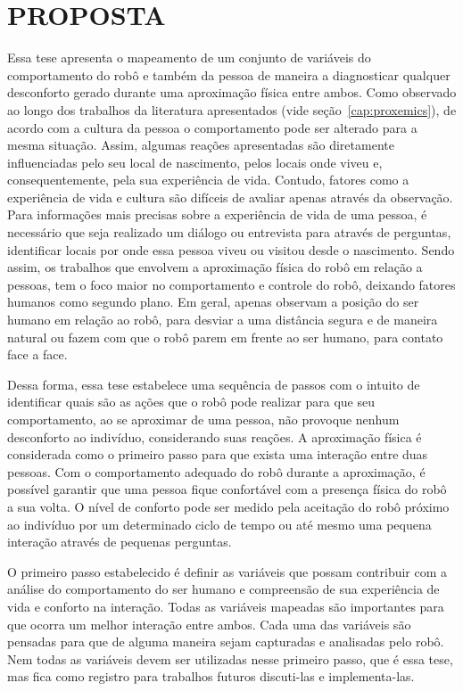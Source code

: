 \chapter{PROPOSTA}
\label{cap:proposta}

Essa tese apresenta o mapeamento de um conjunto de variáveis do comportamento do robô e também da pessoa de maneira a diagnosticar qualquer desconforto gerado durante uma aproximação física entre ambos. Como observado ao longo dos trabalhos da literatura apresentados (vide seção~\ref{cap:proxemics}), de acordo com a cultura da pessoa o comportamento pode ser alterado para a mesma situação. Assim, algumas reações apresentadas são diretamente influenciadas pelo seu local de nascimento, pelos locais onde viveu e, consequentemente, pela sua experiência de vida. Contudo, fatores como a experiência de vida e cultura são difíceis de avaliar apenas através da observação. Para informações mais precisas sobre a experiência de vida de uma pessoa, é necessário que seja realizado um diálogo ou entrevista para através de perguntas, identificar locais por onde essa pessoa viveu ou visitou desde o nascimento. Sendo assim, os trabalhos que envolvem a aproximação física do robô em relação a pessoas, tem o foco maior no comportamento e controle do robô, deixando fatores humanos como segundo plano. Em geral, apenas observam a posição do ser humano em relação ao robô, para desviar a uma distância segura e de maneira natural ou fazem com que o robô parem em frente ao ser humano, para contato face a face.

Dessa forma, essa tese estabelece uma sequência de passos com o intuito de identificar quais são as ações que o robô pode realizar para que seu comportamento, ao se aproximar de uma pessoa, não provoque nenhum desconforto ao indivíduo, considerando suas reações. A aproximação física é considerada como o primeiro passo para que exista uma interação entre duas pessoas. Com o comportamento adequado do robô durante a aproximação, é possível garantir que uma pessoa fique confortável com a presença física do robô a sua volta. O nível de conforto pode ser medido pela aceitação do robô próximo ao indivíduo por um determinado ciclo de tempo ou até mesmo uma pequena interação através de pequenas perguntas.

O primeiro passo estabelecido é definir as variáveis que possam contribuir com a análise do comportamento do ser humano e compreensão de sua experiência de vida e conforto na interação. Todas as variáveis mapeadas são importantes para que ocorra um melhor interação entre ambos. Cada uma das variáveis são pensadas para que de alguma maneira sejam capturadas e analisadas pelo robô. Nem todas as variáveis devem ser utilizadas nesse primeiro passo, que é essa tese, mas fica como registro para trabalhos futuros discuti-las e implementa-las.

